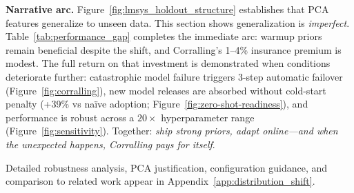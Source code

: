 \noindent \textbf{Narrative arc.} Figure~\ref{fig:lmsys_holdout_structure} establishes that PCA features generalize to unseen data. This section shows generalization is \emph{imperfect}. Table~\ref{tab:performance_gap} completes the immediate arc: warmup priors remain beneficial despite the shift, and Corralling's 1--4\% insurance premium is modest. The full return on that investment is demonstrated when conditions deteriorate further: catastrophic model failure triggers 3-step automatic failover (Figure~\ref{fig:corralling}), new model releases are absorbed without cold-start penalty (+39\% vs na\"ive adoption; Figure~\ref{fig:zero-shot-readiness}), and performance is robust across a $20\times$ hyperparameter range (Figure~\ref{fig:sensitivity}). Together: \emph{ship strong priors, adapt online---and when the unexpected happens, Corralling pays for itself}.

Detailed robustness analysis, PCA justification, configuration guidance, and comparison to related work appear in Appendix~\ref{app:distribution_shift}.
